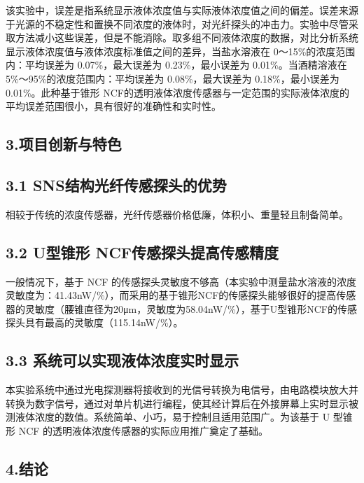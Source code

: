 \documentclass[
  10
]{article}
\begin{document}
该实验中，误差是指系统显示液体浓度值与实际液体浓度值之间的偏差。误差来源于光源的不稳定性和置换不同浓度的液体时，对光纤探头的冲击力。实验中尽管采取方法减小这些误差，但是不能消除。取多组不同液体浓度的数据，对比分析系统显示液体浓度值与液体浓度标准值之间的差异，当盐水溶液在
0～15\%的浓度范围内：平均误差为 0.07\%，最大误差为 0.23\%，最小误差为
0.01\%。当酒精溶液在 5\%～95\%的浓度范围内：平均误差为
0.08\%，最大误差为 0.18\%，最小误差为 0.01\%。此种基于锥形
NCF的透明液体浓度传感器与一定范围的实际液体浓度的平均误差范围很小，具有很好的准确性和实时性。

\subsection{3.项目创新与特色}\label{ux9879ux76eeux521bux65b0ux4e0eux7279ux8272}

\subsection{3.1
SNS结构光纤传感探头的优势}\label{snsux7ed3ux6784ux5149ux7ea4ux4f20ux611fux63a2ux5934ux7684ux4f18ux52bf}

相较于传统的浓度传感器，光纤传感器价格低廉，体积小、重量轻且制备简单。

\subsection{3.2 U型锥形
NCF传感探头提高传感精度}\label{uux578bux9525ux5f62-ncfux4f20ux611fux63a2ux5934ux63d0ux9ad8ux4f20ux611fux7cbeux5ea6}

一般情况下，基于 NCF
的传感探头灵敏度不够高（本实验中测量盐水溶液的浓度灵敏度为：41.43nW/\%），而采用的基于锥形NCF的传感探头能够很好的提高传感器的灵敏度（腰锥直径为20μm，灵敏度为58.04nW/\%），基于U型锥形NCF的传感探头具有最高的灵敏度（115.14nW/\%）。

\subsection{3.3
系统可以实现液体浓度实时显示}\label{ux7cfbux7edfux53efux4ee5ux5b9eux73b0ux6db2ux4f53ux6d53ux5ea6ux5b9eux65f6ux663eux793a}

本实验系统中通过光电探测器将接收到的光信号转换为电信号，由电路模块放大并转换为数字信号，通过对单片机进行编程，使其经计算后在外接屏幕上实时显示被测液体浓度的数值。系统简单、小巧，易于控制且适用范围广。为该基于
U 型锥形 NCF 的透明液体浓度传感器的实际应用推广奠定了基础。

\subsection{4.结论}\label{ux7ed3ux8bba}
\end{document}

